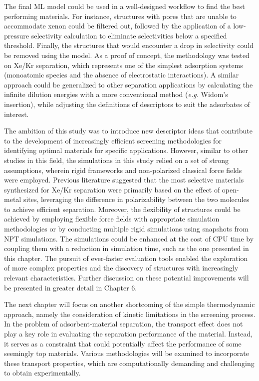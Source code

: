 \documentclass[main]{subfiles}
\begin{document}
The final ML model could be used in a well-designed workflow to find the best performing materials. For instance, structures with pores that are unable to accommodate xenon could be filtered out, followed by the application of a low-pressure selectivity calculation to eliminate selectivities below a specified threshold. Finally, the structures that would encounter a drop in selectivity could be removed using the model. As a proof of concept, the methodology was tested on Xe/Kr separation, which represents one of the simplest adsorption systems (monoatomic species and the absence of electrostatic interactions). A similar approach could be generalized to other separation applications by calculating the infinite dilution energies with a more conventional method (\emph{e.g.} Widom's insertion), while adjusting the definitions of descriptors to suit the adsorbates of interest.

The ambition of this study was to introduce new descriptor ideas that contribute to the development of increasingly efficient screening methodologies for identifying optimal materials for specific applications. However, similar to other studies in this field, the simulations in this study relied on a set of strong assumptions, wherein rigid frameworks and non-polarized classical force fields were employed. Previous literature suggested that the most selective materials synthesized for Xe/Kr separation were primarily based on the effect of open-metal sites, leveraging the difference in polarizability between the two molecules to achieve efficient separation.\autocite{Li_2019, Pei_2022} Moreover, the flexibility of structures could be achieved by employing flexible force fields with appropriate simulation methodologies\autocite{Bousquet2012} or by conducting multiple rigid simulations using snapshots from NPT simulations\autocite{Witman_2017}. The simulations could be enhanced at the cost of CPU time by coupling them with a reduction in simulation time, such as the one presented in this chapter. The pursuit of ever-faster evaluation tools enabled the exploration of more complex properties and the discovery of structures with increasingly relevant characteristics. Further discussion on these potential improvements will be presented in greater detail in Chapter 6.

\vspace{1cm}

The next chapter will focus on another shortcoming of the simple thermodynamic approach, namely the consideration of kinetic limitations in the screening process. In the problem of adsorbent-material separation, the transport effect does not play a key role in evaluating the separation performance of the material. Instead, it serves as a constraint that could potentially affect the performance of some seemingly top materials. Various methodologies will be examined to incorporate these transport properties, which are computationally demanding and challenging to obtain experimentally.

\OnlyInSubfile{\printglobalbibliography}
\end{document}
